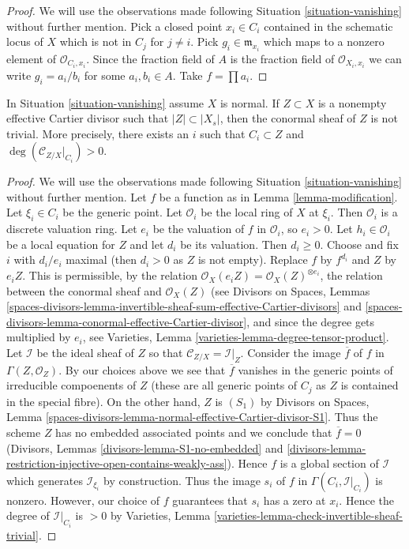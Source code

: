 \begin{proof}
We will use the observations made following Situation \ref{situation-vanishing}
without further mention. Pick a closed point $x_i \in C_i$ contained in the
schematic locus of $X$ which is not in $C_j$ for $j \not = i$. Pick
$g_i \in \mathfrak m_{x_i}$ which maps to a nonzero element of
$\mathcal{O}_{C_i, x_i}$. Since the fraction field of $A$ is the
fraction field of $\mathcal{O}_{X_i, x_i}$ we can write
$g_i = a_i/b_i$ for some $a_i, b_i \in A$. Take $f = \prod a_i$.
\end{proof}

\begin{lemma}
\label{lemma-nontrivial-normal-bundle}
In Situation \ref{situation-vanishing} assume $X$ is normal.
If $Z \subset X$ is a nonempty effective Cartier divisor such that
$|Z| \subset |X_s|$, then the conormal sheaf of $Z$ is not trivial.
More precisely, there exists an $i$ such that $C_i \subset Z$
and $\deg(\mathcal{C}_{Z/X}|_{C_i}) > 0$.
\end{lemma}

\begin{proof}
We will use the observations made following Situation \ref{situation-vanishing}
without further mention. Let $f$ be a function as in
Lemma \ref{lemma-modification}. Let $\xi_i \in C_i$ be the generic point. Let
$\mathcal{O}_i$ be the local ring of $X$ at $\xi_i$. Then $\mathcal{O}_i$
is a discrete valuation ring. Let $e_i$ be the valuation of
$f$ in $\mathcal{O}_i$, so $e_i > 0$. Let $h_i \in \mathcal{O}_i$ be a local
equation for $Z$ and let $d_i$ be its valuation. Then $d_i \geq 0$.
Choose and fix $i$ with $d_i/e_i$ maximal (then $d_i > 0$ as
$Z$ is not empty). Replace $f$ by $f^{d_i}$ and $Z$ by $e_iZ$.
This is permissible, by the relation
$\mathcal{O}_X(e_i Z) = \mathcal{O}_X(Z)^{\otimes e_i}$,
the relation between the conormal sheaf and $\mathcal{O}_X(Z)$
(see Divisors on Spaces, Lemmas
\ref{spaces-divisors-lemma-invertible-sheaf-sum-effective-Cartier-divisors}
and \ref{spaces-divisors-lemma-conormal-effective-Cartier-divisor}, and
since the degree gets multiplied by $e_i$, see
Varieties, Lemma \ref{varieties-lemma-degree-tensor-product}.
Let $\mathcal{I}$ be the ideal sheaf of $Z$ so that
$\mathcal{C}_{Z/X} = \mathcal{I}|_Z$. Consider the image $\overline{f}$
of $f$ in $\Gamma(Z, \mathcal{O}_Z)$. By our choices above we see
that $\overline{f}$ vanishes in the generic points of irreducible
compoenents of $Z$ (these are all generic points of $C_j$ as $Z$ is
contained in the special fibre). On the other hand, $Z$ is $(S_1)$ by
Divisors on Spaces, Lemma
\ref{spaces-divisors-lemma-normal-effective-Cartier-divisor-S1}.
Thus the scheme $Z$ has no embedded associated points and
we conclude that $\overline{f} = 0$ (Divisors, Lemmas
\ref{divisors-lemma-S1-no-embedded} and
\ref{divisors-lemma-restriction-injective-open-contains-weakly-ass}).
Hence $f$ is a global section of $\mathcal{I}$
which generates $\mathcal{I}_{\xi_i}$ by construction.
Thus the image $s_i$ of $f$ in $\Gamma(C_i, \mathcal{I}|_{C_i})$ is nonzero.
However, our choice of $f$ guarantees that $s_i$ has a zero at $x_i$.
Hence the degree of $\mathcal{I}|_{C_i}$ is $>0$ by
Varieties, Lemma \ref{varieties-lemma-check-invertible-sheaf-trivial}.
\end{proof}

